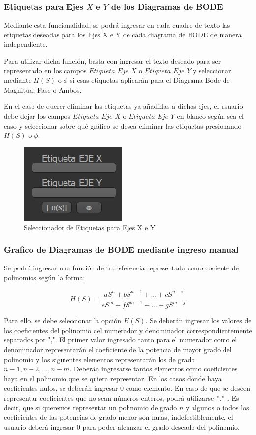 \subsubsection{Etiquetas para Ejes $X$ e $Y$ de los Diagramas de BODE}

Mediante esta funcionalidad, se podrá ingresar en cada cuadro de texto las etiquetas deseadas para los Ejes X e Y de cada diagrama de BODE de manera independiente. 

Para utilizar dicha función, basta con ingresar el texto deseado para ser representado en los campos $Etiqueta$ $Eje$ $X$ o $Etiqueta$ $Eje$ $Y$ y seleccionar mediante $H(S)$ o $\phi$ si esas etiquetas aplicarán para el Diagrama Bode de Magnitud, Fase o Ambos.

En el caso de querer eliminar las etiquetas ya añadidas a dichos ejes, el usuario debe dejar los campos $Etiqueta$ $Eje$ $X$ o $Etiqueta$ $Eje$ $Y$  en blanco según sea el caso y seleccionar sobre qué gráfico se desea eliminar las etiquetas presionando $H(S)$ o $\phi$.

\begin{figure}[!htb] 
    \centering 
    \includegraphics [scale=0.8]{../EJ2/LatexScreenshots/plotToolBotonEtiqueta.png} 
    \caption{Seleccionador de Etiquetas para Ejes X e Y}
    \label{fig:labelButtonPlotTool}
\end{figure}

\subsubsection{Grafico de Diagramas de BODE mediante ingreso manual}


Se podrá ingresar una función de transferencia representada como cociente de polinomios según la forma:

$$H(S) = \frac{aS^n + bS^{n-1}+ ... +cS^{n-i}}{eS^m + fS^{m-1}+ ... +gS^{m-j}} $$

Para ello, se debe seleccionar la opción $H(S)$. Se deberán ingresar los valores de los coeficientes del polinomio del numerador y denominador correspondientemente separados por ",". El primer valor ingresado tanto para el numerador como el denominador representarán el coeficiente de la potencia de mayor grado del polinomio y los siguientes elementos representarán los de grado $n-1, n -2 , ... , n-m$. 
Deberán ingresarse tantos elementos como coeficientes haya en el polinomio que se quiera representar. En los casos donde haya coeficientes nulos, se deberán ingresar $0$ como elemento.
En caso de que se deseen representar coeficientes que no sean números enteros, podrá utilizarse $"."$ .
Es decir, que si queremos representar un polinomio de grado $n$ y algunos o todos los coeficientes de las potencias de grado menor son nulas, indefectiblemente, el usuario deberá ingresar $0$ para poder alcanzar el grado deseado del polinomio.

